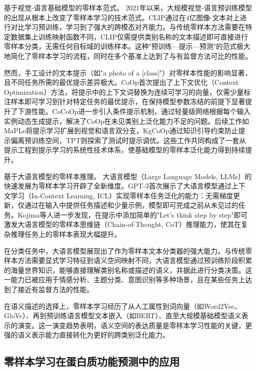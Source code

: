 基于视觉-语言基础模型的零样本范式。 2021年以来，大规模视觉-语言预训练模型的出现从根本上改变了零样本学习的技术范式。CLIP\cite{radford2021learning}通过在4亿图像-文本对上进行对比学习预训练，学习到了强大的跨模态对齐能力。与传统零样本方法需要在特定数据集上训练映射函数不同，CLIP仅需提供类别名称的文本描述即可直接进行零样本分类，无需任何目标域的训练样本。这种"预训练—提示—预测"的范式极大地简化了零样本学习的流程，同时在多个基准上达到了与有监督方法可比的性能。

然而，手工设计的文本提示（如"a photo of a [class]"）对零样本性能的影响显著，且不同任务所需的最优提示差异极大。CoOp\cite{zhou2022learning}首次提出了上下文优化（Context Optimization）方法，将提示中的上下文词替换为连续可学习的向量，仅需少量标注样本即可学习到针对特定任务的最优提示，在保持模型参数冻结的前提下显著提升了下游性能。CoCoOp\cite{zhou2022conditional}进一步引入条件提示机制，通过轻量级网络根据每个输入实例动态生成提示，解决了CoOp在未见类别上泛化能力不足的问题。后续工作如MaPLe\cite{khattak2023maple}将提示学习扩展到视觉和语言双分支，KgCoOp\cite{yao2023kgcoop}通过知识引导约束防止提示偏离预训练空间，TPT\cite{shu2022test}则探索了测试时提示调优。这些工作共同构成了一套从提示工程到提示学习的系统性技术体系，使基础模型的零样本泛化能力得到持续提升。

基于大语言模型的零样本推理。 大语言模型（Large Language Models, LLMs）的快速发展为零样本学习开辟了全新维度。GPT-3\cite{brown2020language}首次展示了大语言模型通过上下文学习（In-Context Learning, ICL）实现零样本任务泛化的能力：无需梯度更新，仅通过在输入中提供任务描述和少量示例，模型即可完成之前从未见过的任务。Kojima等人\cite{kojima2022large}进一步发现，在提示中添加简单的"Let's think step by step"即可激发大语言模型的零样本思维链（Chain-of-Thought, CoT）推理能力，使其在复杂推理任务上的零样本表现大幅提升。

在分类任务中，大语言模型展现出了作为零样本文本分类器的强大能力\cite{sun2023text}。与传统零样本方法需要显式学习特征到语义空间映射不同，大语言模型通过预训练阶段积累的海量世界知识，能够直接理解类别名称或描述的语义，并据此进行分类决策。这一能力已被应用于情感分析、主题分类、意图识别等多种场景，且在某些任务上达到了接近有监督方法的性能。

在语义描述的选择上，零样本学习经历了从人工属性到词向量（如Word2Vec\cite{mikolov2013efficient}、GloVe\cite{pennington2014glove}）、再到预训练语言模型文本嵌入（如BERT\cite{devlin2019bert}）、直至大规模基础模型语义表示的演变。这一演变趋势表明，语义空间的表达质量是零样本学习性能的关键，更强的语义表示能力直接转化为更好的跨类别泛化能力。

\subsection{零样本学习在蛋白质功能预测中的应用}

